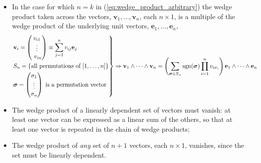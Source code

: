 \documentclass[12pt, twoside, draft]{article}
\begin{document}
\begin{itemize}[noitemsep]
\item In the case for which $n=k$ in (\ref{eq:wedge_product_arbitrary}) the wedge product taken across the vectors, $\mathbf{v}_1, \ldots, \mathbf{v}_n$, each $n \times 1$, is a multiple of the wedge product of the underlying unit vectors,  $\mathbf{e}_1, \ldots, \mathbf{e}_n$,
\begin{equation}
\begin{rcases}
\mathbf{v}_i = \begin{pmatrix} v_{i1} \\ \vdots \\ \ v_{in} \end{pmatrix} \equiv \displaystyle\sum_{j=1}^n v_{ij} \mathbf{e}_j \\
S_n = \left\{ \text{all permutations of } [1, \ldots, n] \right\} \\
\bm{\sigma} = \begin{pmatrix} \sigma_1 \\ \vdots \\ \sigma_n \end{pmatrix} \text{ is a permutation vector}
\end{rcases} \Rightarrow \mathbf{v}_1 \wedge \cdots \wedge \mathbf{v}_n =
\left( \sum_{\bm{\sigma} \in S_n} \operatorname{sgn}(\bm{\sigma}) \prod_{i=1}^n v_{i \sigma_i} \right) \mathbf{e}_1 \wedge \cdots \wedge \mathbf{e}_n
\end{equation}
\item The wedge product of a linearly dependent set of vectors must vanish: at least one vector can be expressed as a linear sum of the others, so that at least one vector is repeated in the chain of wedge products;
\item The wedge product of \textit{any} set of $n+1$ vectors, each $n \times 1$, vanishes, since the set must be linearly dependent.
\end{itemize}
\end{document}
